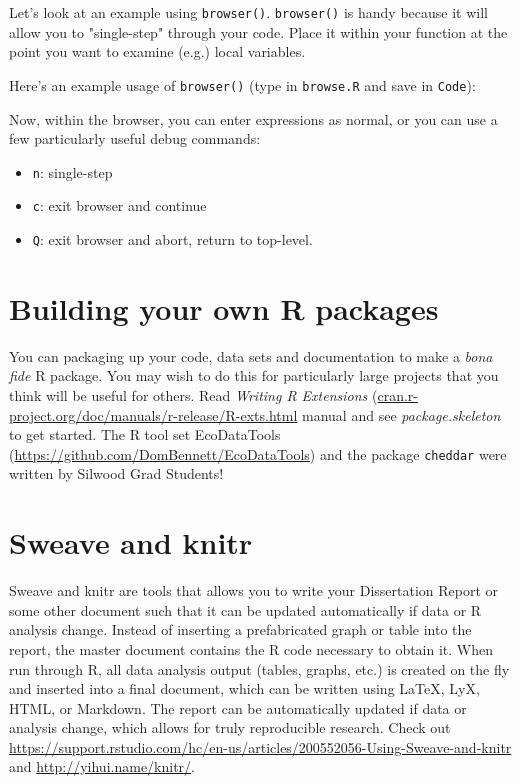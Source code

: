 Let's look at an example using {\tt browser()}. {\tt browser()} is 
handy because it will allow you to "single-step" through your code. 
Place it within your function at the point you want to examine (e.g.) 
local variables. 

Here's an  example usage of {\tt browser()} (type in {\tt browse.R} and 
save in {\tt Code}):



Now, within the browser, you can enter expressions as 
normal, or you can use a few particularly useful debug commands:
\begin{itemize}
\item {\tt n}: single-step 
\item {\tt c}: exit browser and continue
\item {\tt Q}: exit browser and abort, return to top-level.
\end{itemize}

\section{Building your own R packages} 

You can packaging up your code, data sets and documentation to make a 
{\it bona fide} R package. You may wish to do this for particularly 
large projects that you think will be useful for others. Read {\it 
Writing R Extensions} 
(\url{cran.r-project.org/doc/manuals/r-release/R-exts.html} manual and 
see {\it package.skeleton} to get started. The R tool set EcoDataTools 
(\url{https://github.com/DomBennett/EcoDataTools}) and the package 
{\tt cheddar} were written by Silwood Grad Students! 
        
\section{Sweave and knitr}

Sweave and knitr are tools that allows you to write your Dissertation 
Report or some other document such that it can be updated automatically 
if data or R analysis change. Instead of inserting a prefabricated 
graph or table into the report, the master document contains the R code 
necessary to obtain it. When run through R, all data analysis output 
(tables, graphs, etc.) is created on the fly and inserted into a final 
document, which can be written using \LaTeX, LyX, HTML, or Markdown. 
The report can be automatically updated if data or analysis change, 
which allows for truly reproducible research. Check out 
\url{https://support.rstudio.com/hc/en-us/articles/200552056-Using-Sweave-and-knitr} and 
\url{http://yihui.name/knitr/}.

